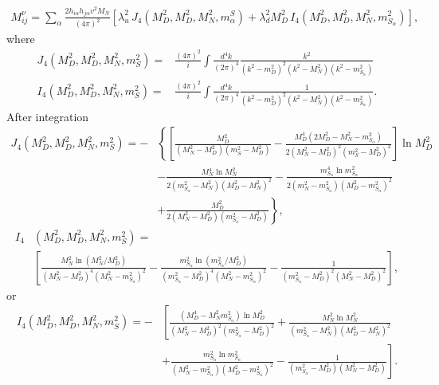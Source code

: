 \begin{align}
  M^{\nu}_{ij}=\sum_{\alpha}\frac{2h_{i\alpha}h_{j\alpha}v^2 M_N}{(4\pi)^2} 
      \left[\lambda_u^{2} \, J_4\left(M_D^2,M_D^2,M_N^2,m^{S}_{\alpha}  \right)
            + \lambda_d^2 M_D^2  \, I_4\left(M_D^2,M_D^2,M_N^2,m^2_{S_\alpha}  \right)
      \right],
\end{align}
where
\begin{align}
   J_4\left(M_D^2,M_D^2,M_N^2,m^2_{S}  \right)=&\frac{(4\pi)^2}{i}
   \int \frac{d^4 k}{(2\pi)^4}
\frac{k^2}{\left(k^2-m_D^2\right)^2\left( k^2-M_N^2 \right)\left(k^2-m_{S_\alpha}^2\right)} \nonumber\\
   I_4\left(M_D^2,M_D^2,M_N^2,m^2_{S}  \right)=&\frac{(4\pi)^2}{i}
   \int \frac{d^4 k}{(2\pi)^4}
\frac{1}{\left(k^2-m_D^2\right)^2\left( k^2-M_N^2 \right)\left(k^2-m_{S_\alpha}^2\right)}.
\end{align}
After integration
\begin{align*}
  J_4\left(M_D^2,M_D^2,M_N^2,m^2_{S}  \right)=
-&\left\{  \left[\frac{M_D^2}{\left(M_N^2-M_D^2\right)\left(m_{S}^2-M_D^2\right)} 
-\frac{M_D^4 \left(2M_D^2-M_N^2-m_{S_\alpha}^2\right)}{2\left(M_N^2-M_D^2\right)^2\left(m_{S}^2-M_D^2\right)^2} \right]\ln M_D^2\right.\nonumber\\
&-\frac{M_N^4\ln M_N^2}{2\left( m_{S_\alpha}^2-M_N^2 \right)\left( M_D^2-M_N^2 \right)^2}-
\frac{m_{S_\alpha}^4\ln m_{S_\alpha}^2}{2\left( m_N^2-m_{S_\alpha}^2 \right)\left( M_D^2-m_{S_\alpha}^2 \right)^2}
\nonumber\\
 &\left.+\frac{M_D^2}{2\left(M_N^2-M_D^2  \right)\left(m_{S_\alpha}^2-M_D^2  \right)} \right\},
\end{align*}
\begin{align}
      I_4&\left(M_D^2,M_D^2,M_N^2,m^2_{S}  \right)=\nonumber\\
&\left[\frac{M_N^2\ln \left( M_N^2/M_D^2 \right)}{\left( M_N^2-M_D^2 \right)^4\left( M_N^2-m_{S_\alpha}^2 \right)^2}
      -\frac{m_{S_\alpha}^2\ln \left( m_{S_\alpha}^2/M_D^2 \right)}{\left( m_{S_\alpha}^2-M_D^2 \right)^4\left( M_N^2-m_{S_\alpha}^2 \right)^2}-
      \frac{1}{\left(m_{S_\alpha}^2-M_D^2\right)^2\left(M_N^2 -M_D^2 \right)^2} 
 \right],
\end{align}
or
\begin{align}
   I_4\left(M_D^2,M_D^2,M_N^2,m^2_{S}  \right)=
-&\left[ \frac{\left(M_D^4-M_N^2 m_{S_\alpha}^2\right)\ln M_D^2}{\left(M_N^2 -M_D^2 \right)^2\left(m_{S_\alpha}^2 -M_D^2 \right)^2} 
+\frac{M_N^2 \ln M_N^2}{\left(m_{S_\alpha}^2 -M_N^2 \right)\left(M_D^2-M_N^2\right)^2}\right. \nonumber\\
&\left.+\frac{m_{S_\alpha}^2 \ln m_{S_\alpha}^2}{\left(M_N^2 -m_{S_\alpha}^2 \right)\left(M_D^2-m_{S_\alpha}^2\right)^2} 
-\frac{1}{\left(m_{S_\alpha}^2-M_D^2\right)\left(M_N^2 -M_D^2 \right)} 
\right].
\end{align}


